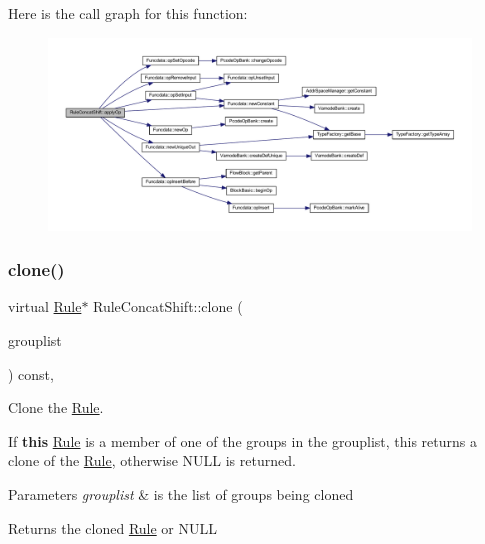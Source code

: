 Here is the call graph for this function\+:
\nopagebreak
\begin{figure}[H]
\begin{center}
\leavevmode
\includegraphics[width=350pt]{class_rule_concat_shift_a7954f9333718c1f1da94e117f1f5e9b1_cgraph}
\end{center}
\end{figure}
\mbox{\label{class_rule_concat_shift_a61c36a17ec824709364df8a3fa9f8ce8}} 
\subsubsection{\texorpdfstring{clone()}{clone()}}
{\footnotesize\ttfamily virtual \mbox{\hyperlink{class_rule}{Rule}}$\ast$ Rule\+Concat\+Shift\+::clone (\begin{DoxyParamCaption}\item[{const \mbox{\hyperlink{class_action_group_list}{Action\+Group\+List}} \&}]{grouplist }\end{DoxyParamCaption}) const\hspace{0.3cm}{\ttfamily [inline]}, {\ttfamily [virtual]}}



Clone the \mbox{\hyperlink{class_rule}{Rule}}. 

If {\bfseries{this}} \mbox{\hyperlink{class_rule}{Rule}} is a member of one of the groups in the grouplist, this returns a clone of the \mbox{\hyperlink{class_rule}{Rule}}, otherwise N\+U\+LL is returned. 
\begin{DoxyParams}{Parameters}
{\em grouplist} & is the list of groups being cloned \\
\hline
\end{DoxyParams}
\begin{DoxyReturn}{Returns}
the cloned \mbox{\hyperlink{class_rule}{Rule}} or N\+U\+LL 
\end{DoxyReturn}


